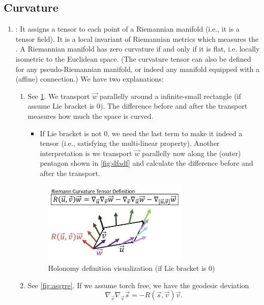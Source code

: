 \documentclass[12pt]{article} %
\begin{document}
\subsection{Curvature}
\begin{enumerate}[label=\textbf{\arabic*})]
    \item {}: It assigns a tensor to each point of a Riemannian manifold (i.e., it is a tensor field). It is a local invariant of Riemannian metrics which measures the . A Riemannian manifold has zero curvature if and only if it is flat, i.e. locally isometric to the Euclidean space. (The curvature tensor can also be defined for any pseudo-Riemannian manifold, or indeed any manifold equipped with a (affine) connection.) We have two explanations:
    \begin{enumerate}[label=(\textbf{\alph*})]
        \item {} See \cref{fig:gadfadf}.  We transport $\vec{w}$ parallelly  around a infinite-small rectangle (if assume Lie bracket is 0). The difference before and after the transport measures how much the space is curved. 
        \begin{itemize}
            \item {} If Lie bracket is not 0, we need the last term to make it indeed a tensor (i.e., satisfying the multi-linear property). Another interpretation is we transport $\vec{w}$ parallelly now along the (outer) pentagon shown in \cref{fig:dfadf} and calculate the difference before and after the transport.
       \end{itemize}
            \begin{figure}[H]
    \centering
    \includegraphics[width=0.7\textwidth]{Figs/c1.jpg}
    \caption{\small Holonomy definition visualization (if Lie bracket is 0)}
    \label{fig:gadfadf}
\end{figure}
\item {} See \cref{fig:asgrre}. If we assume torch free, we have the geodesic deviation $$\nabla_{\vec{v}}\nabla_{\vec{v}} \vec{s}=  -R(\vec{s}, \vec{v})\vec{v}.$$ 

\end{enumerate}
\end{enumerate}
\end{document}

